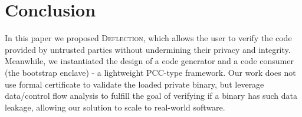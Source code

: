\section{Conclusion}\label{sec-conclusion}

In this paper we proposed \textsc{Deflection}, which allows the user to verify the code provided by untrusted parties without undermining their privacy and integrity. Meanwhile, we instantiated the design of a code generator and a code consumer (the bootstrap enclave) - a lightweight PCC-type framework.
Our work does not use formal certificate to validate the loaded private binary, but leverage data/control flow analysis to fulfill the goal of verifying if a binary has such data leakage, allowing our solution to scale to real-world software. 


 


